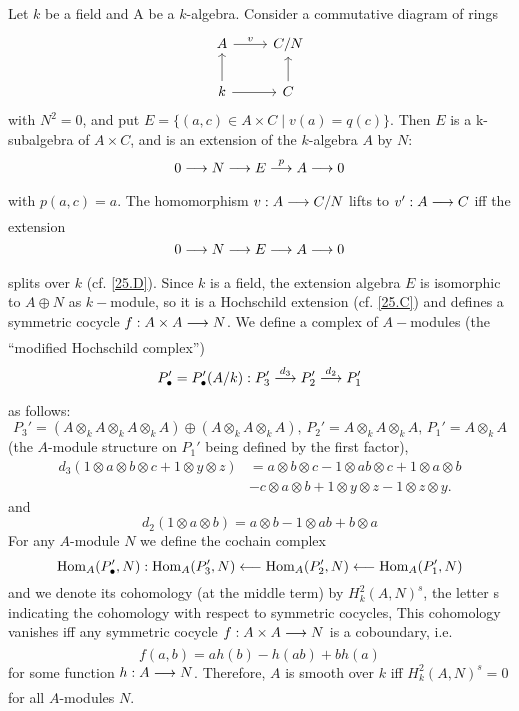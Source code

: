 \documentclass[../main]{subfiles}
\begin{document}
\newparagraph Let $k$ be a field and A be a $k$-algebra. Consider a commutative diagram of rings
\[\begin{tikzcd}
	A & {C/N} \\
	k & C
	\arrow[from=2-1, to=1-1]
	\arrow["v", from=1-1, to=1-2]
	\arrow[from=2-2, to=1-2]
	\arrow[from=2-1, to=2-2]
\end{tikzcd}\]
with $N^2=0$, and put $E=\{(a, c) \in A \times C \mid v(a)=q(c)\}$. Then $E$ is a k-subalgebra of $A \times C$, and is an extension of the $k$-algebra $A$ by $N$: \[ 0 \varrightarrow{} N \varrightarrow{} E \varrightarrow{p} A \varrightarrow{} 0\] with $p(a, c)=a$. The homomorphism $v: A \varrightarrow{} C / N$ lifts to $v': A \varrightarrow{} C$ iff the extension \[0 \varrightarrow{} N \varrightarrow{} E \varrightarrow{} A \varrightarrow{} 0\] splits over $k$ (cf. \ref{25.D}). Since $k$ is a field, the extension algebra $E$ is isomorphic to $A \oplus N$ as $k-$module, so it is a Hochschild extension (cf. \ref{25.C}) and defines a symmetric cocycle $f: A \times A \varrightarrow{} N$. We define a complex of $A-$modules (the ``modified Hochschild complex'') \[P_\bullet' = P_\bullet'(A/k): P_3' \varrightarrow{d_3} P_2' \varrightarrow{d_2}P_1'\] as follows: \[P_3' = (A\otimes_k A\otimes_k A\otimes_k A)\oplus (A\otimes_k A\otimes_k A),\, P_2' =A\otimes_k A\otimes_k A,\, P_1'=A\otimes_k A\] (the $A$-module structure on $P_1'$ being defined by the first factor),
\[\begin{aligned}
d_3(1\otimes a \otimes b \otimes c+1\otimes y \otimes z)& = a\otimes b \otimes c - 1 \otimes ab \otimes c +1\otimes a \otimes b \\&-c \otimes a \otimes b+ 1 \otimes y \otimes z - 1\otimes z \otimes y.
\end{aligned}\]
and
\[d_2(1\otimes a \otimes b)= a\otimes b -1\otimes ab + b\otimes a\]
For any $A$-module $N$ we define the cochain complex
\[
\operatorname{Hom}_A(P_\bullet', N): \operatorname{Hom}_A(P_3', N)\longleftarrow\operatorname{Hom}_A(P_2', N)\longleftarrow\operatorname{Hom}_A(P_1', N)
\]
and we denote its cohomology (at the middle term) by $H_k^2(A, N)^s$, the letter s indicating the cohomology with respect to
symmetric cocycles, This cohomology vanishes iff any symmetric cocycle $f: A \times A \varrightarrow{} N$ is a coboundary, i.e.
\[f(a, b)=a h(b)-h(a b)+b h(a)\] for some function $h: A \varrightarrow{} N$.
Therefore, $A$ is smooth over $k$ iff $H_k^2(A, N)^s=0$ for all $A$-modules $N$.
\end{document}
